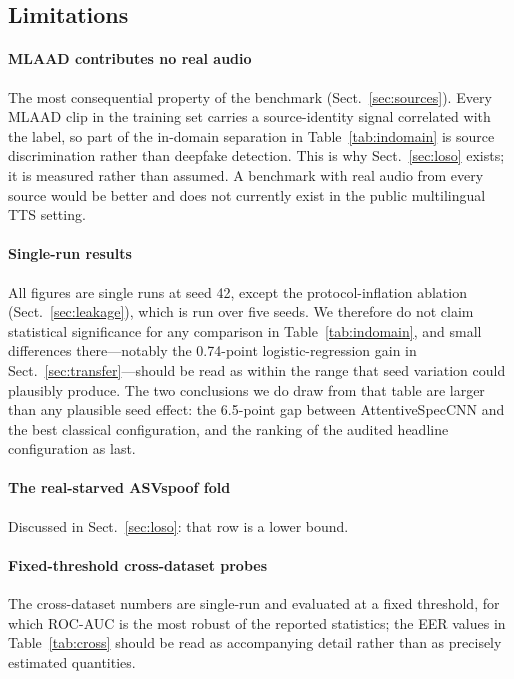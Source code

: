 \documentclass[sn-mathphys-num,pdflatex]{sn-jnl}
\begin{document}
\subsection{Limitations}\label{sec:limits}

\paragraph{MLAAD contributes no real audio}
The most consequential property of the benchmark
(Sect.~\ref{sec:sources}). Every MLAAD clip in the training set carries a
source-identity signal correlated with the label, so part of the in-domain
separation in Table~\ref{tab:indomain} is source discrimination rather than
deepfake detection. This is why Sect.~\ref{sec:loso} exists; it is measured
rather than assumed. A benchmark with real audio from every source would be
better and does not currently exist in the public multilingual TTS setting.

\paragraph{Single-run results}
All figures are single runs at seed 42, except the protocol-inflation ablation
(Sect.~\ref{sec:leakage}), which is run over five seeds. We therefore do not claim
statistical significance for any comparison in Table~\ref{tab:indomain}, and small
differences there---notably the 0.74-point logistic-regression gain in
Sect.~\ref{sec:transfer}---should be read as within the range that seed variation
could plausibly produce. The two conclusions we do draw from that table are
larger than any plausible seed effect: the 6.5-point gap between
AttentiveSpecCNN and the best classical configuration, and the ranking of the
audited headline configuration as last.

\paragraph{The real-starved ASVspoof fold}
Discussed in Sect.~\ref{sec:loso}: that row is a lower bound.

\paragraph{Fixed-threshold cross-dataset probes}
The cross-dataset numbers are single-run and evaluated at a fixed threshold, for
which ROC-AUC is the most robust of the reported statistics; the EER values in
Table~\ref{tab:cross} should be read as accompanying detail rather than as
precisely estimated quantities.
\end{document}
